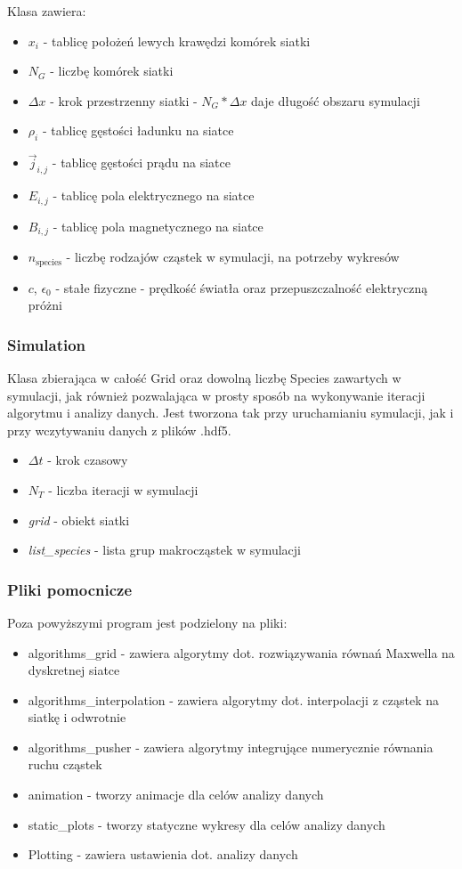 Klasa zawiera:
\begin{itemize}
    \item $x_i$ - tablicę położeń lewych krawędzi komórek siatki
    \item $N_G$ - liczbę komórek siatki
    \item $\Delta x$ - krok przestrzenny siatki - $N_G * \Delta x$ daje długość obszaru symulacji
    \item $\rho_i$ - tablicę gęstości ładunku na siatce
    \item $\vec{j}_{i,j}$ - tablicę gęstości prądu na siatce
    \item $E_{i,j}$ - tablicę pola elektrycznego na siatce
    \item $B_{i,j}$ - tablicę pola magnetycznego na siatce
    \item $n_{\text{species}}$ - liczbę rodzajów cząstek w symulacji, na potrzeby wykresów
    \item $c$, $\epsilon_0$ - stałe fizyczne - prędkość światła oraz przepuszczalność elektryczną próżni %
\end{itemize}



\subsubsection{Simulation}
Klasa zbierająca w całość Grid oraz dowolną liczbę Species zawartych w symulacji, jak również
pozwalająca w prosty sposób na wykonywanie iteracji algorytmu i analizy danych. Jest tworzona tak przy
uruchamianiu symulacji, jak i przy wczytywaniu danych z plików .hdf5.

\begin{itemize}
\item $\Delta t$ - krok czasowy
\item $N_T$ - liczba iteracji w symulacji
\item \emph{grid} - obiekt siatki
\item \emph{list\_species} - lista grup makrocząstek w symulacji
\end{itemize}

\subsubsection{Pliki pomocnicze}
Poza powyższymi program jest podzielony na pliki:
\begin{itemize}
\item algorithms\_grid - zawiera algorytmy dot. rozwiązywania równań Maxwella na dyskretnej siatce
\item algorithms\_interpolation - zawiera algorytmy dot. interpolacji z cząstek na siatkę i odwrotnie
\item algorithms\_pusher - zawiera algorytmy integrujące numerycznie równania ruchu cząstek
\item animation - tworzy animacje dla celów analizy danych
\item static\_plots - tworzy statyczne wykresy dla celów analizy danych
\item Plotting - zawiera ustawienia dot. analizy danych %
\end{itemize}

